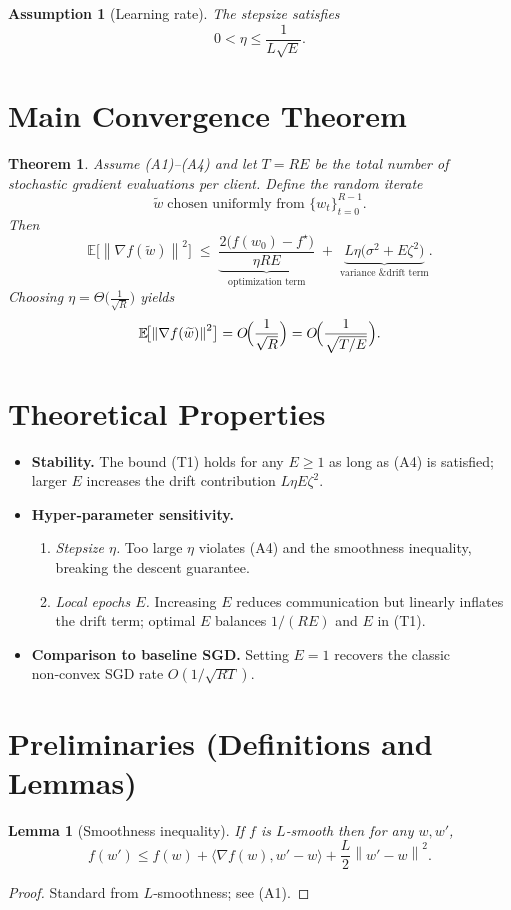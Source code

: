 \documentclass{article}
\newtheorem{theorem}{Theorem}
\newtheorem{lemma}{Lemma}
\newtheorem{assumption}{Assumption}
\newcommand{\EE}{\mathbb{E}}
\newcommand{\norm}[1]{\left\lVert#1\right\rVert}
\newcommand{\inner}[2]{\langle #1,#2\rangle}
\begin{document}
\begin{assumption}[Learning rate]
The stepsize satisfies
\[
0<\eta\le\frac{1}{L\sqrt{E}} .
\tag{A4}
\]
\end{assumption}

\section*{Main Convergence Theorem}
\begin{theorem}\label{thm:main}
Assume (A1)–(A4) and let $T=RE$ be the total number of stochastic gradient evaluations per client.  
Define the random iterate
\[
\widetilde w \;\text{chosen uniformly from }\{w_t\}_{t=0}^{R-1}.
\]
Then
\[
\EE\!\bigl[\norm{\nabla f(\widetilde w)}^2\bigr]
\;\le\;
\underbrace{\frac{2\bigl(f(w_0)-f^\star\bigr)}{\eta R E}}_{\text{optimization term}}
\;+\;
\underbrace{L\eta\bigl(\sigma^2+E\zeta^2\bigr)}_{\text{variance \& drift term}} .
\tag{T1}
\]
Choosing $\eta = \Theta\!\bigl(\tfrac{1}{\sqrt{R}}\bigr)$ yields
\[
\EE\!\bigl[\norm{\nabla f(\widetilde w)}^2\bigr]=O\!\Bigl(\frac{1}{\sqrt{R}}\Bigr)
=O\!\Bigl(\frac{1}{\sqrt{T/E}}\Bigr) .
\]
\end{theorem}

\section*{Theoretical Properties}
\begin{itemize}
\item \textbf{Stability.} The bound (T1) holds for any $E\ge1$ as long as (A4) is satisfied; larger $E$ increases the drift contribution $L\eta E\zeta^2$.
\item \textbf{Hyper‑parameter sensitivity.}
    \begin{enumerate}[label=(\alph*)]
    \item \emph{Stepsize $\eta$.} Too large $\eta$ violates (A4) and the smoothness inequality, breaking the descent guarantee.
    \item \emph{Local epochs $E$.} Increasing $E$ reduces communication but linearly inflates the drift term; optimal $E$ balances $1/(RE)$ and $E$ in (T1).
    \end{enumerate}
\item \textbf{Comparison to baseline SGD.}
    Setting $E=1$ recovers the classic non‑convex SGD rate $O(1/\sqrt{RT})$.
\end{itemize}

\section*{Preliminaries (Definitions and Lemmas)}
\begin{lemma}[Smoothness inequality]\label{lem:smooth}
If $f$ is $L$‑smooth then for any $w,w'$,
\[
f(w')\le f(w)+\inner{\nabla f(w)}{w'-w}+\frac{L}{2}\norm{w'-w}^2 .
\]
\end{lemma}
\begin{proof}
Standard from $L$‑smoothness; see (A1). \qedhere
\end{proof}
\end{document}
